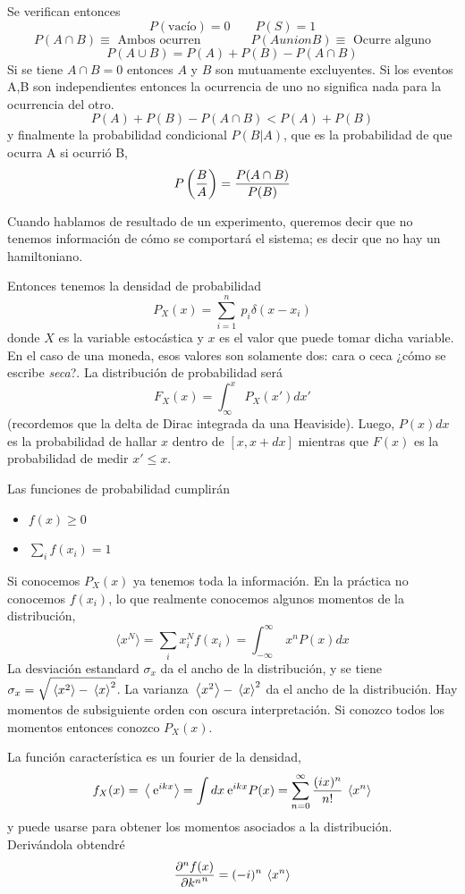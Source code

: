 \documentclass[10pt,oneside]{CBFT_book}
\begin{document}
Se verifican entonces
\[
	P(\text{vacío}) = 0 \qquad P(S) = 1
\]
\[
	P(A \cap B ) \equiv \text{ Ambos ocurren}
	\qquad \qquad 
	P(A union B ) \equiv \text{ Ocurre alguno}
\]
\[
	P( A \cup B) = P(A) + P(B) - P(A \cap B)
\]
Si se tiene $ A \cap B = 0$ entonces $A$ y $B$ son mutuamente excluyentes.
Si los eventos A,B son independientes entonces la ocurrencia de uno no significa
nada para la ocurrencia del otro.
\[
	P(A) + P(B) - P(A\cap B) < P(A) + P(B) 
\]
y finalmente la probabilidad condicional $P(B|A)$, que es la probabilidad de
que ocurra A si ocurrió B,
\[
	P\Frac{B}{A} = \frac{P(A\cap B)}{P(B)}
\]

Cuando hablamos de resultado de un experimento, queremos decir que no tenemos 
información de cómo se comportará el sistema; es decir que no hay un hamiltoniano.

Entonces tenemos la densidad de probabilidad
\[
	P_X(x) = \sum_{i=1}^n \ p_i \delta(x - x_i)
\]
donde $X$ es la variable estocástica y $x$ es el valor que puede tomar dicha variable.
En el caso de una moneda, esos valores son solamente dos: cara o ceca ¿cómo se
escribe {\it seca}?.
La distribución de probabilidad será
\[
	F_X (x) = \int_\infty^x \: P_X(x') dx'
\]
(recordemos que la delta de Dirac integrada da una Heaviside).
Luego, $P(x)dx$ es la probabilidad de hallar $x$ dentro de $[x,x+dx]$ mientras que
$F(x)$ es la probabilidad de medir $x'\leq x$.

Las funciones de probabilidad cumplirán
\begin{itemize}
 \item $f(x) \geq 0$
 \item $\sum_i f(x_i) = 1$
\end{itemize}

Si conocemos $P_X(x)$ ya tenemos toda la información.
En la práctica no conocemos $f(x_i)$, lo que realmente conocemos algunos 
momentos de la distribución,
\[
	\langle x^N \rangle = \sum_i x^N_i f(x_i) =
	\int_{-\infty}^\infty \: x^n P(x) dx
\]
La desviación estandard $\sigma_x$ da el ancho de la distribución, y se tiene
$\sigma_x = \sqrt{\vm{x^2} - \vm{x}^2 }$.
La varianza $\vm{x^2} - \vm{x}^2$ da el ancho de la distribución.
Hay momentos de subsiguiente orden con oscura interpretación.
Si conozco todos los momentos entonces conozco $P_X(x)$.

La función característica es un fourier de la densidad,
\[
	f_X(x) = \vm{\euler^{ikx}} = \int dx \euler^{ikx} P(x) = 
	\sum_{n=0}^\infty \frac{(ix)^n}{n!} \vm{x^n}
\]
y puede usarse para obtener los momentos asociados a la distribución.
Derivándola obtendré
\[
	\dpar[n]{f(x)}{k^n} = (-i)^n \vm{ x^n }
\]
\end{document}
